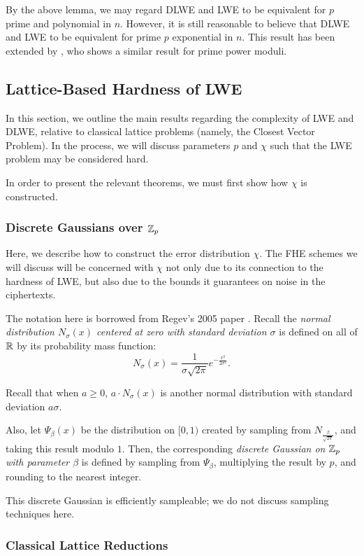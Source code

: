    By the above lemma, we may regard DLWE and LWE to be equivalent for $p$ prime and polynomial in $n$. However, it is still reasonable to believe that DLWE and LWE to be equivalent for prime $p$ exponential in $n$. This result has been extended by \cite{MM2011}, who shows a similar result for prime power moduli.

    \subsection{Lattice-Based Hardness of LWE}
    In this section, we outline the main results regarding the complexity of LWE and DLWE, relative to classical lattice problems (namely, the Closest Vector Problem). In the process, we will discuss parameters $p$ and $\chi$ such that the LWE problem may be considered hard.

    In order to present the relevant theorems, we must first show how $\chi$ is constructed.
    \subsubsection{Discrete Gaussians over $\mathbb{Z}_p$}
    Here, we describe how to construct the error distribution $\chi$. The FHE schemes we will discuss will be concerned with $\chi$ not only due to its connection to the hardness of LWE, but also due to the bounds it guarantees on noise in the ciphertexts.

    The notation here is borrowed from Regev's 2005 paper \cite{regev2005}. Recall the \emph{normal distribution $N_{\sigma}(x)$ centered at zero with standard deviation $\sigma$} is defined on all of $\mathbb{R}$ by its probability mass function:
    \[ N_{\sigma}(x) = \frac{1}{\sigma \sqrt{2 \pi}} e^{-\frac{x^2}{2\sigma^2}}.\]

    Recall that when $a \geq 0$, $a \cdot N_{\sigma}(x)$ is another normal distribution with standard deviation $a \sigma$.

    Also, let $\Psi_\beta(x)$ be the distribution on $[0,1)$ created by sampling from $N_{\frac{\beta}{\sqrt{2 \pi}}}$, and taking this result modulo $1$. Then, the corresponding \emph{discrete Gaussian on $\mathbb{Z}_p$ with parameter $\beta$} is defined by sampling from $\Psi_\beta$, multiplying the result by $p$, and rounding to the nearest integer.

    This discrete Gaussian is efficiently sampleable; we do not discuss sampling techniques here.

    \subsubsection{Classical Lattice Reductions}

